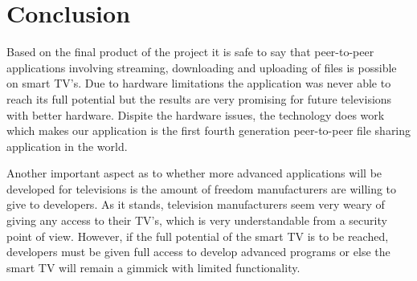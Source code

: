 \chapter{Conclusion}
Based on the final product of the project it is safe to say that peer-to-peer applications involving streaming, downloading and uploading of files is possible on smart TV's. Due to hardware limitations the application was never able to reach its full potential but the results are very promising for future televisions with better hardware. Dispite the hardware issues, the technology does work which makes our application is the first fourth generation peer-to-peer file sharing application in the world.

Another important aspect as to whether more advanced applications will be developed for televisions is the amount of freedom manufacturers are willing to give to developers. As it stands, television manufacturers seem very weary of giving any access to their TV's, which is very understandable from a security point of view. However, if the full potential of the smart TV is to be reached, developers must be given full access to develop advanced programs or else the smart TV will remain a gimmick with limited functionality.